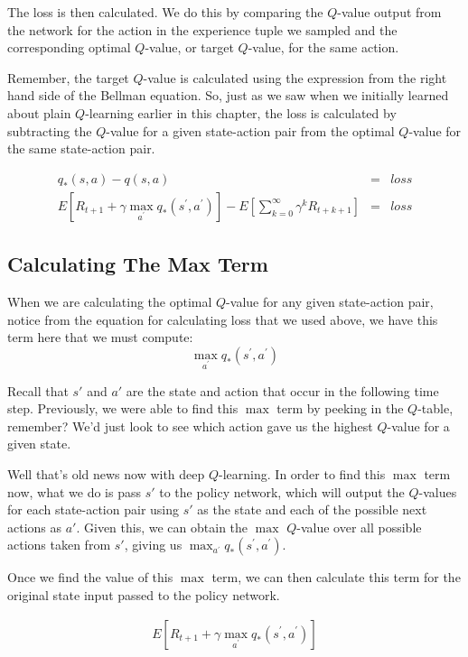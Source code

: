 The loss is then calculated. We do this by comparing the $Q$-value output from the network 
for the action in the experience tuple we sampled and the corresponding optimal $Q$-value, 
or target $Q$-value, for the same action.

Remember, the target $Q$-value is calculated using the expression from the right hand side 
of the Bellman equation. So, just as we saw when we initially learned about plain 
$Q$-learning earlier in this chapter, the loss is calculated by subtracting the $Q$-value 
for a given state-action pair from the optimal $Q$-value for the same state-action pair.

\begin{eqnarray*}
q_{\ast }\left( s,a\right) - q(s,a) &=& loss \\
E\left[ R_{t+1}+\gamma \max_{a^{\prime }}q_{\ast }\left( s^\prime,a^{\prime }\right)\right] 
- E\left[ \sum_{k=0}^{\infty }\gamma ^{k}R_{t+k+1}\right]
&=& loss
\end{eqnarray*}


\subsection{Calculating The Max Term}

When we are calculating the optimal $Q$-value for any given state-action pair, notice 
from the equation for calculating loss that we used above, we have this term here that 
we must compute:
$$
\max_{a^{\prime }}q_{\ast }\left( s^\prime,a^{\prime }\right)
$$

Recall that $s'$ and $a'$ are the state and action that occur in the following time step. 
Previously, we were able to find this $\max$ term by peeking in the $Q$-table, remember? 
We'd just look to see which action gave us the highest $Q$-value for a given state.

Well that's old news now with deep $Q$-learning. In order to find this $\max$ term now, 
what we do is pass $s'$ to the policy network, which will output the $Q$-values for each 
state-action pair using $s'$ as the state and each of the possible next actions as $a'$. 
Given this, we can obtain the $\max$ $Q$-value over all possible actions taken from $s'$, 
giving us $\max_{a^{\prime }}q_{\ast }\left( s^\prime,a^{\prime }\right)$.

Once we find the value of this $\max$ term, we can then calculate this term for the 
original state input passed to the policy network.

\begin{eqnarray*}
E\left[ R_{t+1}+\gamma \max_{a^{\prime }}q_{\ast }\left( s^\prime,a^{\prime }\right)\right]
\end{eqnarray*}
 

